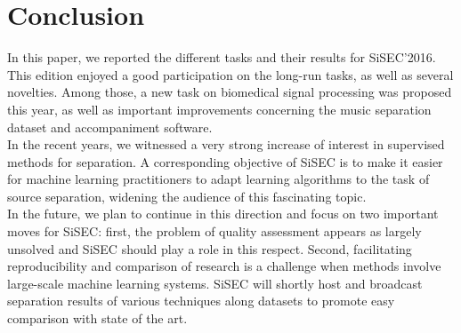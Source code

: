 \documentclass{llncs}
\begin{document}
\section{Conclusion}
\label{sec:concl}
\vspace{-2mm}
In this paper, we reported the different tasks and their results for SiSEC'2016. This edition enjoyed a good participation on the long-run tasks, as well as several novelties. Among those, a new task on biomedical signal processing was proposed this year, as well as important improvements concerning the music separation dataset and accompaniment software. \\In the recent years, we witnessed a very strong increase of interest in supervised methods for separation. A corresponding objective of SiSEC is to make it easier for machine learning practitioners to adapt learning algorithms to the task of source separation, widening the audience of this fascinating topic.\\
In the future, we plan to continue in this direction and focus on two important moves for SiSEC: first, the problem of quality assessment appears as largely unsolved and SiSEC should play a role in this respect. Second, facilitating reproducibility and comparison of research is a challenge when methods involve large-scale machine learning systems. SiSEC will shortly host and broadcast separation results of various techniques along datasets to promote easy comparison with state of the art.

\footnotesize


\end{document}
